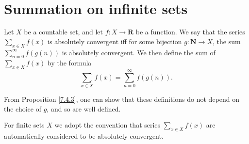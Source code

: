 \section{Summation on infinite sets}\label{sec 8.2}

\begin{definition}\label{8.2.1}
    Let \(X\) be a countable set, and let \(f : X \to \mathbf{R}\) be a function.
    We say that the series \(\sum_{x \in X} f(x)\) is absolutely convergent iff for some bijection \(g : \mathbf{N} \to X\), the sum \(\sum_{n = 0}^\infty f(g(n))\) is absolutely convergent.
    We then define the sum of \(\sum_{x \in X} f(x)\) by the formula
    \[
        \sum_{x \in X} f(x) = \sum_{n = 0}^\infty f(g(n)).
    \]
\end{definition}

\begin{note}
    From Proposition \ref{7.4.3}, one can show that these definitions do not depend on the choice of \(g\), and so are well defined.
\end{note}

\begin{note}
    For finite sets \(X\) we adopt the convention that series \(\sum_{x \in X} f(x)\) are automatically considered to be absolutely convergent.
\end{note}

